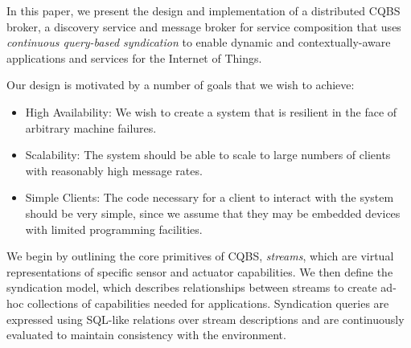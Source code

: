 In this paper, we present the design and implementation of a distributed CQBS broker, a discovery service and message broker for service composition that uses \emph{continuous query-based syndication} to enable dynamic and contextually-aware applications and services for the Internet of Things.

Our design is motivated by a number of goals that we wish to achieve:
\begin{itemize}
\item High Availability: We wish to create a system that is resilient in the face of arbitrary machine failures.
\item Scalability: The system should be able to scale to large numbers of clients with reasonably high message rates.
\item Simple Clients: The code necessary for a client to interact with the system should be very simple, since we assume that they may be embedded devices with limited programming facilities.
\end{itemize}

We begin by outlining the core primitives of CQBS, \emph{streams}, which are virtual representations of specific sensor and actuator capabilities.
We then define the syndication model, which describes relationships between streams to create ad-hoc collections of capabilities needed for applications.
Syndication queries are expressed using SQL-like relations over stream descriptions and are continuously evaluated to maintain consistency with the environment.

